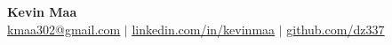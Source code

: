 \documentclass[letterpaper,10pt]{article}
\begin{document}
\begin{center}
    \textbf{\Huge Kevin Maa} \\ \vspace{1pt}
    \small \href{mailto:kmaa302@gmail.com}{\underline{kmaa302@gmail.com}} $|$ 
    \href{https://www.linkedin.com/in/kevinmaa}{\underline{linkedin.com/in/kevinmaa}} $|$
    \href{https://www.github.com/dz337}{\underline{github.com/dz337}}
\end{center}



%

\end{document}
